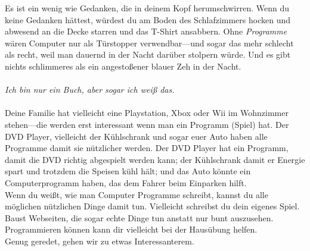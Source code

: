 Es ist ein wenig wie Gedanken, die in deinem Kopf herumschwirren. Wenn du keine Gedanken hättest, würdest du am Boden des Schlafzimmers hocken und abwesend an die Decke starren und das T-Shirt ansabbern. Ohne \emph{Programme} wären Computer nur als Türstopper verwendbar---und sogar das mehr schlecht als recht, weil man dauernd in der Nacht darüber stolpern würde. Und es gibt nichts schlimmeres als ein angestoßener blauer Zeh in der Nacht.
\\
\\
\emph{Ich bin nur ein Buch, aber sogar ich weiß das.}
\\
\\
Deine Familie hat vielleicht eine Playstation, Xbox oder Wii im Wohnzimmer stehen---die werden erst interessant wenn man ein Programm (Spiel) hat. Der DVD Player, vielleicht der Kühlschrank und sogar euer Auto haben alle Programme damit sie nützlicher werden. Der DVD Player hat ein Programm, damit die DVD richtig abgespielt werden kann; der Kühlschrank damit er Energie spart und trotzdem die Speisen kühl hält; und das Auto könnte ein Computerprogramm haben, das dem Fahrer beim Einparken hilft.\\
Wenn du weißt, wie man Computer Programme schreibt, kannst du alle möglichen nützlichen Dinge damit tun. Vielleicht schreibst du dein eigenes Spiel. Baust Webseiten, die sogar echte Dinge tun anstatt nur bunt auszusehen. Programmieren können kann dir vielleicht bei der Hausübung helfen.
\\
Genug geredet, gehen wir zu etwas Interessanterem.

